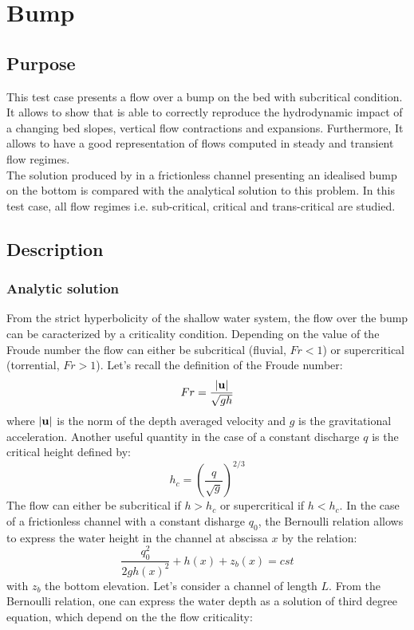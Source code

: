 \chapter{Bump}\label{chapter:bump}

\section{Purpose}

This test case presents a flow over a bump on the bed with subcritical condition.
It allows to show that  is able to correctly reproduce
the hydrodynamic impact of a changing bed slopes, vertical flow
contractions and expansions. Furthermore, It allows to have a good
representation of flows computed in steady and transient flow regimes. \\

The solution produced by  in a frictionless channel
presenting an idealised bump on the bottom  is compared with
the analytical solution to this problem. In this test case,
all flow regimes i.e. sub-critical, critical and trans-critical are studied.

\section{Description}

\subsection{Analytic solution}

From the strict hyperbolicity of the shallow water system, the flow over the bump can be caracterized by a
criticality condition. Depending on the value of the Froude number
the flow can either be subcritical (fluvial, $Fr<1$)
or supercritical (torrential, $Fr>1$).
Let's recall the definition of the Froude number:
\begin{equation}
Fr = \dfrac{|{\bf u}|}{\sqrt{gh}}
\end{equation}
where $|{\bf u}|$ is the norm of the depth averaged velocity and $g$ is the gravitational acceleration. Another useful quantity in the case of a constant discharge $q$ is the critical height defined by:
\begin{equation}
h_c = \left( \dfrac{q}{\sqrt{g}}\right)^{2/3}
\end{equation}
The flow can either be subcritical if $h>h_c$ or supercritical if $h<h_c$.
In the case of a frictionless channel with a constant disharge $q_0$, the Bernoulli relation allows to express the water height in the channel at abscissa $x$ by the relation:
\begin{equation}
\dfrac{q_0^2}{2 g h(x)^2} + h(x) + z_b(x) = cst
\end{equation}
with $z_b$ the bottom elevation. Let's consider a channel of length $L$.
From the Bernoulli relation, one can express the water depth as a solution of third degree equation, which depend on the
the flow criticality:

